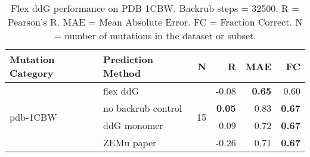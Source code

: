 \begin{table}
  \begin{tabular}{llrrrr}
\toprule
Mutation Category &   Prediction Method &   N &     R &  MAE &   FC \\
\midrule
 \multirow{ 4}{*}{pdb-1CBW} & flex ddG & \multirow{ 4}{*}{15} & -0.08 & \textbf{0.65} & 0.60  \\
 & no backrub control & & \textbf{0.05} & 0.83 & \textbf{0.67}  \\
 & ddG monomer & & -0.09 & 0.72 & \textbf{0.67}  \\
 & ZEMu paper & & -0.26 & 0.71 & \textbf{0.67}  \\
\bottomrule
\end{tabular}
  \caption[Flex ddG performance on PDB 1CBW]{
    Flex ddG performance on PDB 1CBW. Backrub steps = 32500. R = Pearson's R. MAE = Mean Absolute Error. FC = Fraction Correct. N = number of mutations in the dataset or subset.
  } \label{tab:table-pdb-1CBW}
\end{table}
